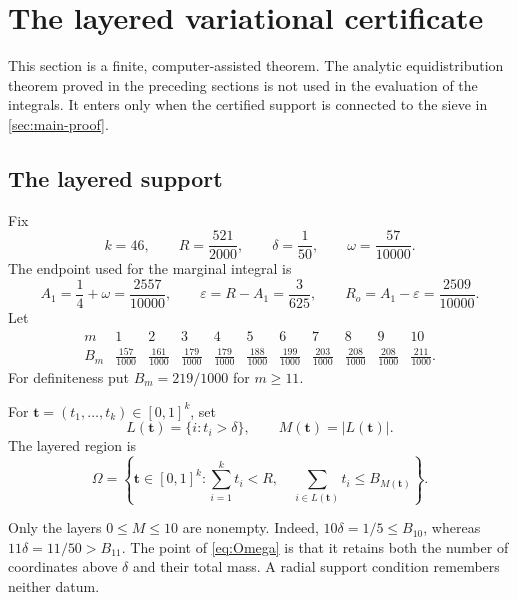 \section{The layered variational certificate}
\label{sec:layered}

This section is a finite, computer-assisted theorem.  The analytic
equidistribution theorem proved in the preceding sections is not used in the
evaluation of the integrals.  It enters only when the certified support is
connected to the sieve in \cref{sec:main-proof}.

\subsection{The layered support}

Fix
\begin{equation}\label{eq:finite-parameters}
 k=46,\qquad
 R=\frac{521}{2000},\qquad
 \delta=\frac1{50},\qquad
 \omega=\frac{57}{10000}.
\end{equation}
The endpoint used for the marginal integral is
\begin{equation}\label{eq:outer-radius}
 A_1=\frac14+\omega=\frac{2557}{10000},\qquad
 \varepsilon=R-A_1=\frac3{625},\qquad
 R_o=A_1-\varepsilon=\frac{2509}{10000}.
\end{equation}
Let
\[
\begin{array}{c|cccccccccc}
m&1&2&3&4&5&6&7&8&9&10\\ \hline
B_m&
\frac{157}{1000}&\frac{161}{1000}&\frac{179}{1000}&
\frac{179}{1000}&\frac{188}{1000}&\frac{199}{1000}&
\frac{203}{1000}&\frac{208}{1000}&\frac{208}{1000}&
\frac{211}{1000}.
\end{array}
\]
For definiteness put $B_m=219/1000$ for $m\ge11$.

\begin{definition}\label{def:layered-region}
For $\mathbf t=(t_1,\ldots,t_k)\in[0,1]^k$, set
\[
 L(\mathbf t)=\{i:t_i>\delta\},
 \qquad M(\mathbf t)=|L(\mathbf t)|.
\]
The layered region is
\begin{equation}\label{eq:Omega}
 \Omega=\left\{\mathbf t\in[0,1]^k:
 \sum_{i=1}^k t_i<R,\quad
 \sum_{i\in L(\mathbf t)}t_i\le B_{M(\mathbf t)}
 \right\}.
\end{equation}
\end{definition}

Only the layers $0\le M\le10$ are nonempty.  Indeed,
$10\delta=1/5\le B_{10}$, whereas
$11\delta=11/50>B_{11}$.  The point of \cref{eq:Omega} is that it retains
both the number of coordinates above $\delta$ and their total mass.  A
radial support condition remembers neither datum.

